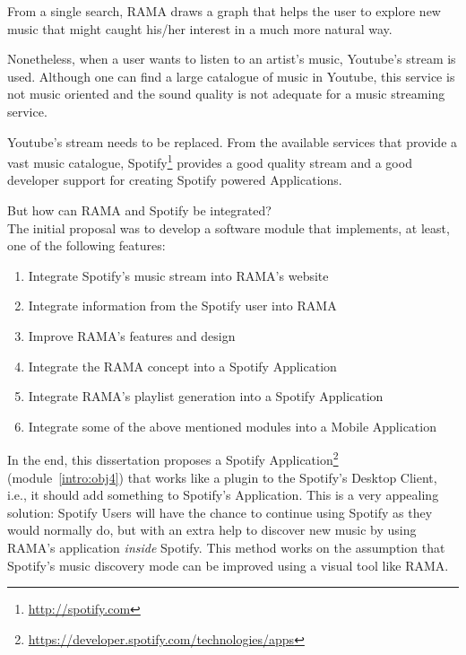 \documentclass[twocolumn]{article}
\begin{document}
  From a single search, RAMA draws a graph that helps the user to explore new music that might caught his/her interest in a much more natural way.

  Nonetheless, when a user wants to listen to an artist's music, Youtube's stream is used.
  Although one can find a large catalogue of music in Youtube, this service is not music oriented and the sound quality is not adequate for a music streaming service.

  Youtube's stream needs to be replaced.
  From the available services that provide a vast music catalogue, Spotify\footnote{\url{http://spotify.com}} provides a good quality stream and a good developer support for creating Spotify powered Applications.

  But how can RAMA and Spotify be integrated? \\

  The initial proposal was to develop a software module that implements, at least, one of the following features:

  \begin{enumerate}
    \item \label{intro:obj1} Integrate Spotify's music stream into RAMA's website
    \item \label{intro:obj2} Integrate information from the Spotify user into RAMA
    \item \label{intro:obj3} Improve RAMA's features and design
    \item \label{intro:obj4} Integrate the RAMA concept into a Spotify Application
    \item \label{intro:obj5} Integrate RAMA's playlist generation into a Spotify Application
    \item \label{intro:obj6} Integrate some of the above mentioned modules into a Mobile Application
  \end{enumerate}

  In the end, this dissertation proposes a Spotify Application\footnote{\url{https://developer.spotify.com/technologies/apps}} (module~\ref{intro:obj4}) that works like a plugin to the Spotify's Desktop Client, i.e., it should add something to Spotify's Application.
  This is a very appealing solution: Spotify Users will have the chance to continue using Spotify as they would normally do, but with an extra help to discover new music by using RAMA's application \emph{inside} Spotify. 
  This method works on the assumption that Spotify's music discovery mode can be improved using a visual tool like RAMA. \\
\end{document}
